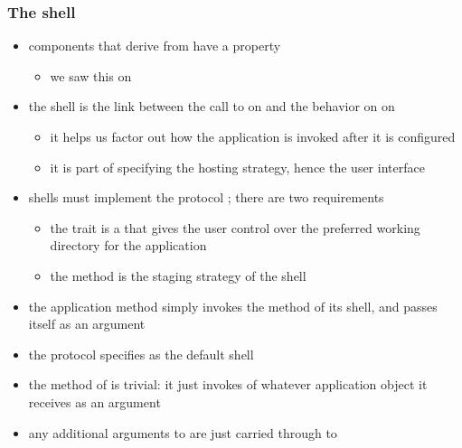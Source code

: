 \begin{frame}
%
  \frametitle{The  shell}
%
  \begin{itemize}
%
  \item components that derive from  have a property 
    \begin{itemize}
    \item we saw this on 
    \end{itemize}
%
  \item the shell is the link between the call to  on
     and the behavior  on
     on 
    \begin{itemize}
    \item it helps us factor out how the application is invoked after it is configured
    \item it is part of specifying the hosting strategy, hence the user interface
    \end{itemize}
%
  \item shells must implement the protocol ; there are two requirements
    \begin{itemize}
    \item the trait  is a  that gives the user control over the
      preferred working directory for the application
    \item the method  is the staging strategy of the shell
    \end{itemize}
%
  \item the application method  simply invokes the method  of its
    shell, and passes itself as an argument
%
  \item the protocol  specifies  as the default shell
%
  \item the method  of  is trivial: it just invokes 
    of whatever application object it receives as an argument
%
  \item any additional arguments to  are just carried through to 
%
  \end{itemize}
%
\end{frame}

